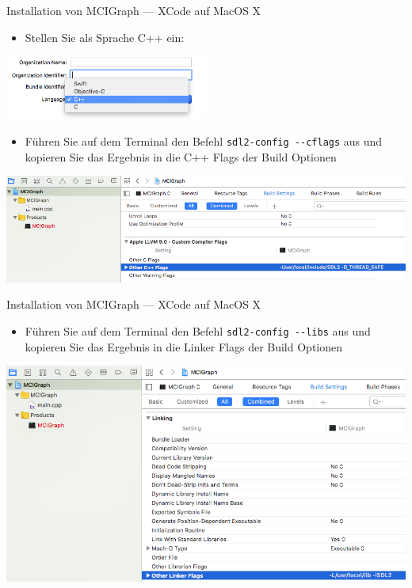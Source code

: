 \documentclass[presentation]{beamer}
\begin{document}
\begin{frame}[label={sec:orge07d780},fragile]{Installation von MCIGraph --- XCode auf MacOS X}
 \begin{itemize}
\item Stellen Sie als Sprache C++ ein:
\end{itemize}
\begin{center}\begin{center}
\includegraphics[width=0.5\textwidth]{xcode_images/language.png}
\end{center}\end{center}
\begin{itemize}
\item Führen Sie auf dem Terminal den Befehl {\color{solarizedYellow}\texttt{sdl2-config -{}-cflags} }aus und
kopieren Sie das Ergebnis in die C++ Flags der Build Optionen
\end{itemize}
\begin{center}\begin{center}
\includegraphics[width=.9\linewidth]{xcode_images/cflags.png}
\end{center}\end{center}
\end{frame}
\begin{frame}[label={sec:orgb4d2bf0},fragile]{Installation von MCIGraph --- XCode auf MacOS X}
 \begin{itemize}
\item Führen Sie auf dem Terminal den Befehl {\color{solarizedYellow}\texttt{sdl2-config -{}-libs} }aus und
kopieren Sie das Ergebnis in die Linker Flags der Build Optionen
\end{itemize}
\begin{center}\begin{center}
\includegraphics[width=.9\linewidth]{xcode_images/linkerflags.png}
\end{center}\end{center}
\end{frame}
\end{document}
